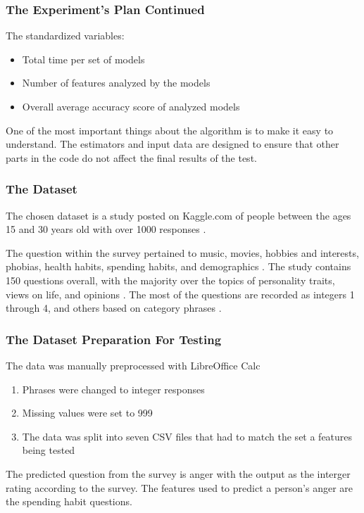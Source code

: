 \documentclass{beamer}
\begin{document}
\begin{frame}
\frametitle{The Experiment's Plan Continued}

The standardized variables:
\newline

\begin{itemize}
\item Total time per set of models
\item Number of features analyzed by the models
\item Overall average accuracy score of analyzed models
\end{itemize}

One of the most important things about the algorithm is to make it easy to understand. The estimators and input data are designed to ensure that other parts in the code do not affect the final results of the test.

\end{frame}

\begin{frame}
\frametitle{The Dataset}

The chosen dataset is a study posted on Kaggle.com of people between the ages 15 and 30 years old  with over 1000 responses \cite{DataSet}. 
\newline

The question within the survey pertained to music, movies, hobbies and interests, phobias, health habits, spending habits, and demographics \cite{DataSet}. 
\newline 
\newline 
The study contains 150 questions overall, with the majority over the topics of personality traits, views on life, and opinions \cite{DataSet}.
\newline
\newline
The most of the questions are recorded as integers 1 through 4, and others based on category phrases \cite{DataSet}.

\end{frame}

\begin{frame}
\frametitle{The Dataset Preparation For Testing}
The data was manually preprocessed with LibreOffice Calc
\newline

\begin{enumerate} 
\item Phrases were changed to integer responses
\item Missing values were set to 999
\item The data was split into seven CSV files that had to match the set a features being tested
\end{enumerate}


The predicted question from the survey is anger with the output as the interger rating according to the survey. The features used to predict a person's anger are the spending habit questions.


\end{frame}
\end{document}
